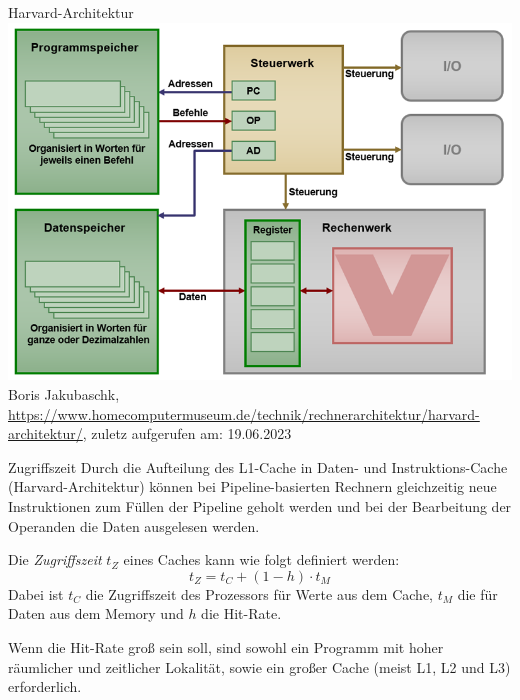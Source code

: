 \begin{example}[Cachehierarchie]{Harvard-Architektur}
  \includegraphics[width=\textwidth]{images/harvard_architektur.png}
  Boris Jakubaschk, \url{https://www.homecomputermuseum.de/technik/rechnerarchitektur/harvard-architektur/}, zuletz aufgerufen am: 19.06.2023
\end{example}

\begin{defi}[Cache]{Zugriffszeit}
  Durch die Aufteilung des L1-Cache in Daten- und Instruktions-Cache (Harvard-Architektur) können bei Pipeline-basierten Rechnern gleichzeitig neue Instruktionen zum Füllen der Pipeline geholt werden und bei der Bearbeitung der Operanden die Daten ausgelesen werden.

  Die \emph{Zugriffszeit} $t_Z$ eines Caches kann wie folgt definiert werden:
  \[
    t_Z = t_{C} + (1 - h) \cdot t_{M}
  \]
  Dabei ist $t_C$ die Zugriffszeit des Prozessors für Werte aus dem Cache, $t_M$ die für Daten aus dem Memory und $h$ die Hit-Rate.

  Wenn die Hit-Rate groß sein soll, sind sowohl ein Programm mit hoher räumlicher und zeitlicher Lokalität, sowie ein großer Cache (meist L1, L2 und L3) erforderlich.
\end{defi}

